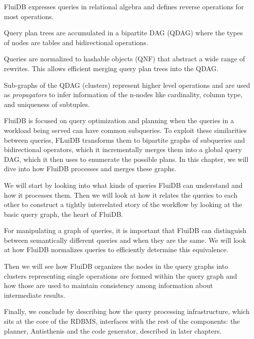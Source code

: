 
\begin{summary}
\item FluiDB expresses queries in relational algebra and defines
  reverse operations for most operations.
\item Query plan trees are accumulated in a bipartite DAG (QDAG) where
  the types of nodes are tables and bidirectional operations.
\item Queries are normalized to hashable objects (QNF) that abstract a
  wide range of rewrites. This allows efficient merging query plan
  trees into the QDAG.
\item Sub-graphs of the QDAG (clusters) represent higher level
  operations and are used as \emph{propagators} to infer information
  of the n-nodes like cardinality, column type, and uniqueness of
  subtuples.
\end{summary}

FluiDB is focused on query optimization and planning when the queries
in a workload being served can have common subqueries.  To exploit
these similarities between queries, FLuiDB transforms them to
bipartite graphs of subqueries and bidirectional operators, which it
incrementally merges them into a global query DAG, which it then uses
to enumerate the possible plans.  In this chapter, we will dive into
how FluiDB processes and merges these graphs.

We will start by looking into what kinds of queries FluiDB
can understand and how it processes them. Then we will look at how it relates
the queries to each other to construct a tightly interrelated story
of the workflow by looking at the basic query graph, the heart of
FluiDB.

For manipulating a graph of queries, it is important that FluiDB can
distinguish between semantically different queries and when they are
the same.  We will look at how FluiDB normalizes queries to
efficiently determine this equivalence.

Then we will see how FluiDB organizes the nodes in the query graphs
into clusters representing single operations are formed within the
query graph and how those are used to maintain consistency among
information about intermediate results.

Finally, we conclude by describing how the query processing
infrastructure, which sits at the core of the RDBMS, interfaces with
the rest of the components: the planner, Antisthenis and the code
generator, described in later chapters.

